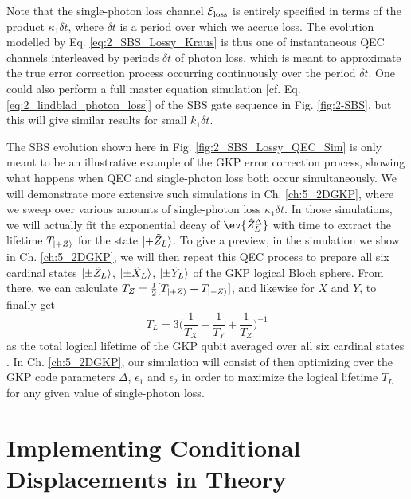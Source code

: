 Note that the single-photon loss channel $\mathcal{E}_{\rm loss}$ is entirely specified in terms of the product $\kappa_1\delta t$, where $\delta t$ is a period over which we accrue loss. The evolution modelled by Eq. \eqref{eq:2_SBS_Lossy_Kraus} is thus one of instantaneous QEC channels interleaved by periods $\delta t$ of photon loss, which is meant to approximate the true error correction process occurring continuously over the period $\delta t$. One could also perform a full master equation simulation [cf. Eq. \eqref{eq:2_lindblad_photon_loss}] of the SBS gate sequence in Fig. \ref{fig:2-SBS}, but this will give similar results for small $k_1\delta t$. 

The SBS evolution shown here in Fig. \ref{fig:2_SBS_Lossy_QEC_Sim} is only meant to be an illustrative example of the GKP error correction process, showing what happens when QEC and single-photon loss both occur simultaneously. We will demonstrate more extensive such simulations in Ch. \ref{ch:5_2DGKP}, where we sweep over various amounts of single-photon loss $\kappa_1\delta t$. In those simulations, we will actually fit the exponential decay of $\ev{\hat{Z}_L^\Delta}$ with time to extract the lifetime $T_{\lvert+Z\rangle}$ for the state $\lvert+\tilde{Z}_L\rangle$. To give a preview, in the simulation we show in Ch. \ref{ch:5_2DGKP}, we will then repeat this QEC process to prepare all six cardinal states $\lvert\pm \tilde{Z}_L\rangle$, $\lvert\pm \tilde{X}_L\rangle$, $\lvert\pm \tilde{Y}_L\rangle$ of the GKP logical Bloch sphere. From there, we can calculate $T_Z = \frac{1}{2}[T_{\lvert+Z\rangle} + T_{\lvert-Z\rangle}]$, and likewise for $X$ and $Y$, to finally get
\begin{equation}
    T_L = 3\bigg(\frac{1}{T_X} + \frac{1}{T_Y} + \frac{1}{T_Z}\bigg)^{-1}
\end{equation}
as the total logical lifetime of the GKP qubit averaged over all six cardinal states \cite{royer2020gkp, sivak2023gkp-expt}. In Ch. \ref{ch:5_2DGKP}, our simulation will consist of then optimizing over the GKP code parameters $\Delta$, $\epsilon_1$ and $\epsilon_2$ in order to maximize the logical lifetime $T_L$ for any given value of single-photon loss. 






\clearpage
\section{Implementing Conditional Displacements in Theory}


